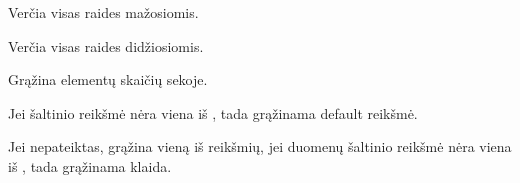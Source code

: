 \documentclass[letterpaper,10pt,lithuanian]{sphinxmanual}
\begin{document}
\begin{fulllineitems}
\begin{fulllineitems}
\label{\detokenize{formules:lower}}
\pysigstartsignatures
\pysiglinewithargsret
{}
{}
{}
\pysigstopsignatures
\sphinxAtStartPar
Verčia visas raides mažosiomis.

\end{fulllineitems}


\begin{fulllineitems}
\label{\detokenize{formules:upper}}
\pysigstartsignatures
\pysiglinewithargsret
{}
{}
{}
\pysigstopsignatures
\sphinxAtStartPar
Verčia visas raides didžiosiomis.

\end{fulllineitems}


\begin{fulllineitems}
\label{\detokenize{formules:len}}
\pysigstartsignatures
\pysiglinewithargsret
{}
{}
{}
\pysigstopsignatures
\sphinxAtStartPar
Grąžina elementų skaičių sekoje.

\end{fulllineitems}


\begin{fulllineitems}
\label{\detokenize{formules:choose}}
\pysigstartsignatures
\pysiglinewithargsret
{}
{}
{}
\pysigstopsignatures
\sphinxAtStartPar
Jei šaltinio reikšmė nėra viena iš {\hyperref[\detokenize{dimensijos:enum}]{}}, tada grąžinama default
reikšmė.

\sphinxAtStartPar
Jei  nepateiktas, grąžina vieną iš {\hyperref[\detokenize{dimensijos:property.enum}]{}}
reikšmių, jei duomenų šaltinio reikšmė nėra viena iš
{\hyperref[\detokenize{dimensijos:property.enum}]{}}, tada grąžinama klaida.


\end{fulllineitems}
\end{fulllineitems}
\end{document}
